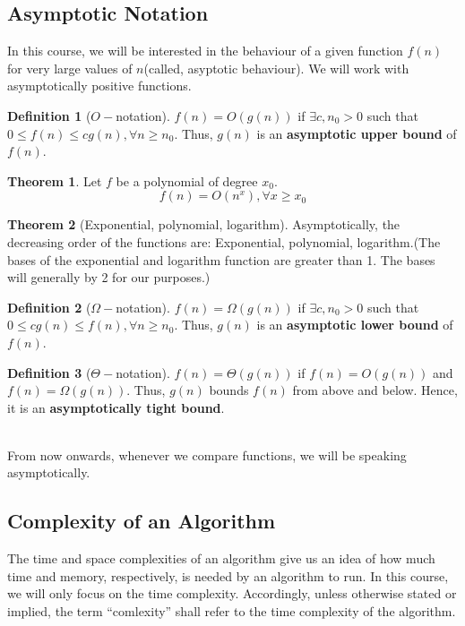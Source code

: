 \documentclass[10pt, a4paper]{extarticle}
\theoremstyle{definition}
\newtheorem{thm}{Theorem}
\newtheorem{defn}{Definition}
\begin{document}
	\subsection{Asymptotic Notation}
	In this course, we will be interested in the behaviour of a given function $f(n)$ for very large values of $n$(called, asyptotic behaviour). We will work with asymptotically positive functions.
	\begin{defn}[$O-$notation]
		$f(n)=O(g(n))$ if $\exists c,n_0>0$ such that $0\leq f(n)\leq cg(n),\forall n\geq n_0$. Thus, $g(n)$ is an \textbf{asymptotic upper bound} of $f(n)$.
	\end{defn}
	\begin{thm}
		Let $f$ be a polynomial of degree $x_0$.
		\[f(n)=O(n^x),\forall x\geq x_0\]
	\end{thm}
	\begin{thm}[Exponential, polynomial, logarithm]
		Asymptotically, the decreasing order of the functions are: Exponential, polynomial, logarithm.(The bases of the exponential and logarithm function are greater than 1. The bases will generally by 2 for our purposes.)
	\end{thm}

	\begin{defn}[$\Omega-$notation]
		$f(n)=\Omega(g(n))$ if $\exists c,n_0>0$ such that $0\leq cg(n)\leq f(n),\forall n\geq n_0$. Thus, $g(n)$ is an \textbf{asymptotic lower bound} of $f(n)$.
	\end{defn}
	\begin{defn}[$\Theta-$notation]
		$f(n)=\Theta(g(n))$ if $f(n)=O(g(n))$ and $f(n)=\Omega(g(n))$. Thus, $g(n)$ bounds $f(n)$ from above and below. Hence, it is an \textbf{asymptotically tight bound}.
	\end{defn}
	\hfill\\
	From now onwards, whenever we compare functions, we will be speaking asymptotically.
	\subsection{Complexity of an Algorithm}
	The time and space complexities of an algorithm give us an idea of how much time and memory, respectively, is needed by an algorithm to run. In this course, we will only focus on the time complexity. Accordingly, unless otherwise stated or implied, the term “comlexity” shall refer to the time complexity of the algorithm.
\end{document}
